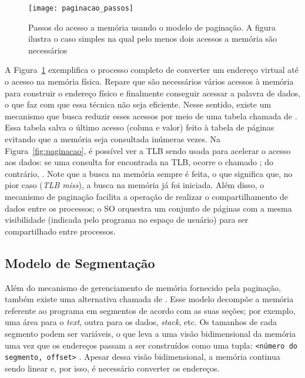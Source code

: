 \begin{figure}[!h]
  \centering
  \texttt{[image: paginacao\_passos]} 
  \caption{Passos do acesso a memória usando o modelo de paginação. A figura ilustra o caso simples na qual pelo menos dois acessos a memória são necessários}
  \label{fig:passos_paginacao}
\end{figure}


A Figura~\ref{fig:passos_paginacao} exemplifica o processo completo de
converter um endereço virtual até o acesso na memória física. Repare que são
necessários vários acessos à memória para construir o endereço físico e
finalmente conseguir acessar a palavra de dados, o que faz com que essa técnica
não seja eficiente.  Nesse sentido, existe um mecanismo que busca reduzir esses
acessos por meio de uma tabela chamada de . Essa tabela salva o último acesso (coluna e valor) feito à
tabela de páginas evitando que a memória seja consultada inúmeras vezes. Na
Figura~\ref{fig:paginacao}, é possível ver a TLB sendo usada para acelerar o
acesso aos dados: se uma consulta for encontrada na TLB, ocorre o chamado
; do contrário, . Note que a busca na memória sempre é feita, o que significa
que, no pior caso (\emph{TLB miss}), a busca na memória já foi iniciada. Além
disso, o mecanismo de paginação facilita a operação de realizar o
compartilhamento de dados entre os processos; o SO orquestra um conjunto de
páginas com a mesma visibilidade (indicada pelo programa no espaço de usuário)
para ser compartilhado entre processos.

\subsection{Modelo de Segmentação}

Além do mecanismo de gerenciamento de memória fornecido pela paginação, também
existe uma alternativa chamada de . Esse modelo
decompõe a memória referente ao programa em segmentos de acordo com as suas
seções; por exemplo, uma área para o \textit{text}, outra para os dados,
\textit{stack}, etc. Os tamanhos de cada segmento podem ser variáveis, o que
leva a uma visão bidimensional da memória uma vez que os endereços passam a ser
construídos como uma tupla: \texttt{<número do segmento, offset>}
\citep{silberschatz}. Apesar dessa visão bidimensional, a memória continua
sendo linear e, por isso, é necessário converter os endereços.

